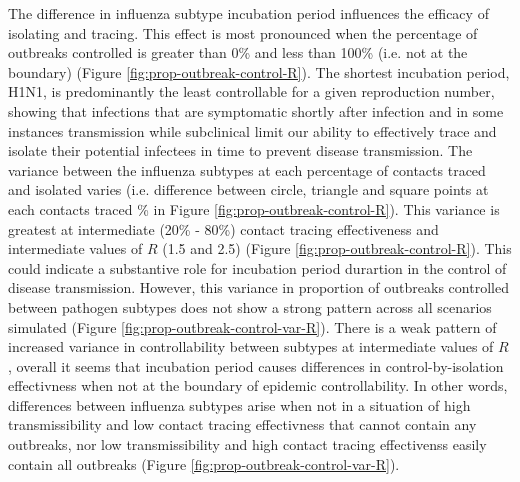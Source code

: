 \documentclass{article}
\begin{document}
The difference in influenza subtype incubation period influences the efficacy of isolating and tracing. This effect is most pronounced when the percentage of outbreaks controlled is greater than 0\% and less than 100\% (i.e. not at the boundary) (Figure \ref{fig:prop-outbreak-control-R}). The shortest incubation period, H1N1, is predominantly the least controllable for a given reproduction number, showing that infections that are symptomatic shortly after infection and in some instances transmission while subclinical limit our ability to effectively trace and isolate their potential infectees in time to prevent disease transmission. The variance between the influenza subtypes at each percentage of contacts traced and isolated varies (i.e. difference between circle, triangle and square points at each contacts traced \% in Figure \ref{fig:prop-outbreak-control-R}). This variance is greatest at intermediate (20\% - 80\%) contact tracing effectiveness and intermediate values of $R$ (1.5 and 2.5) (Figure \ref{fig:prop-outbreak-control-R}). This could indicate a substantive role for incubation period durartion in the control of disease transmission. However, this variance in proportion of outbreaks controlled between pathogen subtypes does not show a strong pattern across all scenarios simulated (Figure \ref{fig:prop-outbreak-control-var-R}). There is a weak pattern of increased variance in controllability between subtypes at intermediate values of $R$, overall it seems that incubation period causes differences in control-by-isolation effectivness when not at the boundary of epidemic controllability. In other words, differences between influenza subtypes arise when not in a situation of high transmissibility and low contact tracing effectivness that cannot contain any outbreaks, nor low transmissibility and high contact tracing effectivenss easily contain all outbreaks (Figure \ref{fig:prop-outbreak-control-var-R}). \\
\end{document}
